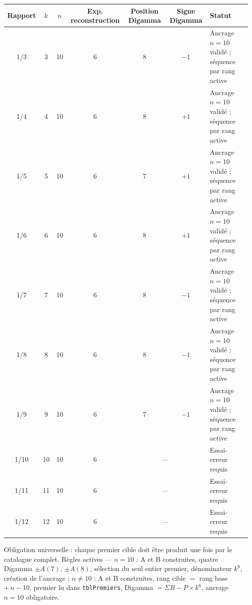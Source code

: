 \documentclass[11pt,a4paper]{article}
\begin{document}
\begin{center}\scriptsize
\setlength{\tabcolsep}{2pt}
\begin{tabular}{@{}c c c c c c l@{}}
\toprule
\rowcolor{spectralgris}
Rapport & $k$ & $n$ & Exp. reconstruction & Position Digamma & Signe Digamma & Statut \\
\midrule
1/3 & 3 & 10 & 6 & 8 & $-1$ & Ancrage $n=10$ validé ; séquence par rang active \\
1/4 & 4 & 10 & 6 & 8 & $+1$ & Ancrage $n=10$ validé ; séquence par rang active \\
1/5 & 5 & 10 & 6 & 7 & $+1$ & Ancrage $n=10$ validé ; séquence par rang active \\
1/6 & 6 & 10 & 6 & 8 & $+1$ & Ancrage $n=10$ validé ; séquence par rang active \\
1/7 & 7 & 10 & 6 & 8 & $-1$ & Ancrage $n=10$ validé ; séquence par rang active \\
1/8 & 8 & 10 & 6 & 8 & $-1$ & Ancrage $n=10$ validé ; séquence par rang active \\
1/9 & 9 & 10 & 6 & 7 & $-1$ & Ancrage $n=10$ validé ; séquence par rang active \\
1/10 & 10 & 10 & 6 & \multicolumn{2}{c}{---} & Essai-erreur requis \\
1/11 & 11 & 10 & 6 & \multicolumn{2}{c}{---} & Essai-erreur requis \\
1/12 & 12 & 10 & 6 & \multicolumn{2}{c}{---} & Essai-erreur requis \\
\bottomrule
\end{tabular}
\end{center}

Obligation universelle : chaque premier cible doit être produit une fois par le
catalogue complet. Règles actives --- $n = 10$ : A et B construites, quatre
Digamma $\pm A(7)$, $\pm A(8)$, sélection du seul entier premier, dénominateur
$k^{6}$, création de l'ancrage ; $n \neq 10$ : A et B construites, rang cible
$=$ rang base $+\,n-10$, premier lu dans \texttt{tblPremiers}, Digamma $= \Sigma B
- P \times k^{6}$, ancrage $n=10$ obligatoire.
\end{document}
